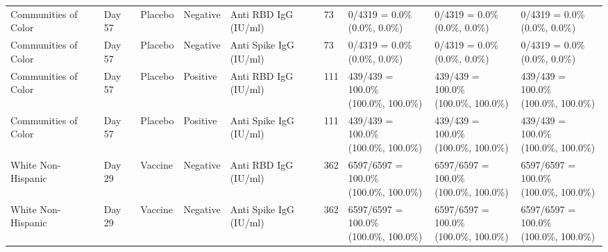 \documentclass[]{book}
\theoremstyle{definition}
\theoremstyle{definition}
\theoremstyle{definition}
\newcommand{\1}{\mathbbm{1}}
\begin{document}
\begin{landscape}
\begin{ThreePartTable}
\begin{longtable}[t]{>{\raggedright\arraybackslash}p{2.7cm}llllllll}
\hspace{1em}Communities of Color & Day 57 & Placebo & Negative & Anti RBD IgG (IU/ml) & 73 & \makecell[l]{0/4319 = 0.0\%\\(0.0\%, 0.0\%)} & \makecell[l]{0/4319 = 0.0\%\\(0.0\%, 0.0\%)} & \makecell[l]{0/4319 = 0.0\%\\(0.0\%, 0.0\%)}\\
\hspace{1em}Communities of Color & Day 57 & Placebo & Negative & Anti Spike IgG (IU/ml) & 73 & \makecell[l]{0/4319 = 0.0\%\\(0.0\%, 0.0\%)} & \makecell[l]{0/4319 = 0.0\%\\(0.0\%, 0.0\%)} & \makecell[l]{0/4319 = 0.0\%\\(0.0\%, 0.0\%)}\\
\hspace{1em}Communities of Color & Day 57 & Placebo & Positive & Anti RBD IgG (IU/ml) & 111 & \makecell[l]{439/439 = 100.0\%\\(100.0\%, 100.0\%)} & \makecell[l]{439/439 = 100.0\%\\(100.0\%, 100.0\%)} & \makecell[l]{439/439 = 100.0\%\\(100.0\%, 100.0\%)}\\
\hspace{1em}Communities of Color & Day 57 & Placebo & Positive & Anti Spike IgG (IU/ml) & 111 & \makecell[l]{439/439 = 100.0\%\\(100.0\%, 100.0\%)} & \makecell[l]{439/439 = 100.0\%\\(100.0\%, 100.0\%)} & \makecell[l]{439/439 = 100.0\%\\(100.0\%, 100.0\%)}\\
\hspace{1em}White Non-Hispanic & Day 29 & Vaccine & Negative & Anti RBD IgG (IU/ml) & 362 & \makecell[l]{6597/6597 = 100.0\%\\(100.0\%, 100.0\%)} & \makecell[l]{6597/6597 = 100.0\%\\(100.0\%, 100.0\%)} & \makecell[l]{6597/6597 = 100.0\%\\(100.0\%, 100.0\%)}\\
\hspace{1em}White Non-Hispanic & Day 29 & Vaccine & Negative & Anti Spike IgG (IU/ml) & 362 & \makecell[l]{6597/6597 = 100.0\%\\(100.0\%, 100.0\%)} & \makecell[l]{6597/6597 = 100.0\%\\(100.0\%, 100.0\%)} & \makecell[l]{6597/6597 = 100.0\%\\(100.0\%, 100.0\%)}\\

\end{longtable}
\end{ThreePartTable}
\end{landscape}
\end{document}
